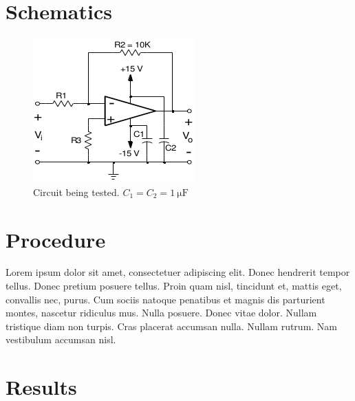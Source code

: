 \documentclass{article}
\begin{document}
\section{Schematics}
\label{sec:schematics}

\begin{figure}[h]
  \label{fig:circuit}
  \centering
    \includegraphics[]{img/circuit.png}
  \caption{Circuit being tested.  $C_1 = C_2 = \SI{1}{\micro\farad}$}
\end{figure}

\section{Procedure}
\label{sec:procedure}


Lorem ipsum dolor sit amet, consectetuer adipiscing elit. Donec
hendrerit tempor tellus. Donec pretium posuere tellus. Proin quam
nisl, tincidunt et, mattis eget, convallis nec, purus. Cum sociis
natoque penatibus et magnis dis parturient montes, nascetur ridiculus
mus. Nulla posuere. Donec vitae dolor. Nullam tristique diam non
turpis. Cras placerat accumsan nulla. Nullam rutrum. Nam vestibulum
accumsan nisl.

\section{Results}
\end{document}
